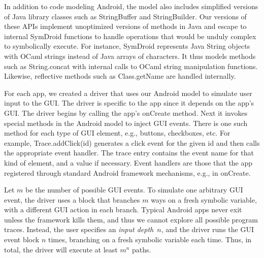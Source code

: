 \documentclass{llncs}
\newcommand{\code}[1]{\textsf{#1}} %
\begin{document}
In addition to code modeling Android, the model also
includes simplified versions of Java library classes such as
\code{StringBuffer} and \code{StringBuilder}.  Our versions of
these APIs implement unoptimized versions of methods in
Java and escape to internal SymDroid functions to handle operations that
would be unduly complex to symbolically execute. For instance, SymDroid
represents Java \code{String} objects with OCaml strings instead of
Java arrays of characters. It thus models methods such as \code{String.concat}
with internal calls to OCaml string manipulation functions. Likewise,
reflective methods such as \code{Class.getName} are handled internally.

For each app, we created a driver that uses our Android model to simulate user
input to the GUI. The driver is specific to the app since it depends on the
app's GUI.  The driver begins by calling the app's \code{onCreate}
method. 
Next it invokes special
methods in the Android model to inject GUI events. There is one such method for
each type of GUI element, e.g., buttons, checkboxes, etc. 
For example,
\code{Trace.addClick(id)} generates a click event for the given
\code{id} and then calls the appropriate event handler.
The trace entry contains the event name for that kind of element,
and a value if necessary. 
Event handlers are those
that the app registered through standard Android framework mechanisms,
e.g., in \code{onCreate}.



Let $m$ be the number of possible GUI events.  To simulate one
arbitrary GUI event, the driver uses a block that branches $m$
ways on a fresh symbolic variable, with a different GUI action
in each branch.  Typical Android apps never exit unless the framework
kills them, and thus we cannot explore all possible program
traces. Instead, the user specifies an \emph{input depth}~$n$, and the
driver runs the GUI event block $n$ times, branching on a fresh
symbolic variable each time. Thus, in total, the driver will execute
at least $m^n$ paths.
\end{document}
